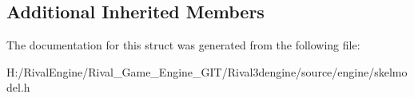 \subsection*{Additional Inherited Members}


The documentation for this struct was generated from the following file\+:\begin{DoxyCompactItemize}
\item 
H\+:/\+Rival\+Engine/\+Rival\+\_\+\+Game\+\_\+\+Engine\+\_\+\+G\+I\+T/\+Rival3dengine/source/engine/skelmodel.\+h\end{DoxyCompactItemize}
